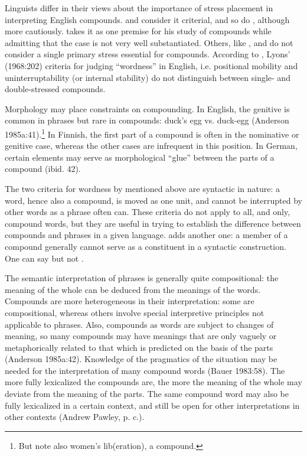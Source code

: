 Linguists differ in their views about the importance of stress placement in interpreting English compounds. \citet[228]{Bloomfield1935} and \citet[41]{Anderson1985a} consider it criterial, and so do \citet[1330]{QuirkEtAl1989}, although more cautiously. \citet[120]{Lees1968} takes it as one premise for his study of compounds while admitting that the case is not very well substantiated. Others, like \citet[31]{Jespersen1933}, \citet{Downing1977} and \citet{Bauer1983} do not consider a single primary stress essential for compounds. According to \citet[105]{Bauer1983}, Lyons' (1968:202) criteria for judging ``wordness'' in English, i.e. positional mobility and uninterruptability (or internal stability) do not distinguish between single- and double-stressed compounds.

Morphology may place constraints on compounding. In English, the genitive is common in phrases but rare in compounds: duck's egg vs. duck-egg (Anderson{ 1985a}:41).\footnote{But note also women's lib(eration), a compound.} In Finnish, the first part of a compound is often in the nominative or genitive case, whereas the other cases are infrequent in this position. In German, certain elements may serve as morphological ``glue'' between the parts of a compound (ibid. 42).

The two criteria for wordness by \citet[202]{Lyons1968} mentioned above are syntactic in nature: a word, hence also a compound, is moved as one unit, and cannot be interrupted by other words as a phrase often can. These criteria do not apply to all, and only, compound words, but they are useful in trying to establish the difference between compounds and phrases in a given language. \citet[232]{Bloomfield1933} adds another one: a member of a compound generally cannot serve as a constituent in a syntactic construction. One can say  but not .

The semantic interpretation of phrases is generally quite compositional: the meaning of the whole can be deduced from the meanings of the words. Compounds are more heterogeneous in their interpretation: some are compositional, whereas others involve special interpretive principles not applicable to phrases. Also, compounds as words are subject to changes of meaning, so many compounds may have meanings that are only vaguely or metaphorically related to that which is predicted on the basis of the parts (Anderson{ 1985a}:42). Knowledge of the pragmatics of the situation may be needed for the interpretation of many compound words (Bauer{ 1983}:58). The more fully lexicalized the compounds are, the more the meaning of the whole may deviate from the meaning of the parts. The same compound word may also be fully lexicalized in a certain context, and still be open for other interpretations in other contexts (Andrew Pawley, p. c.). 

